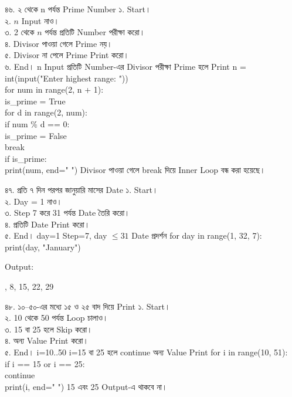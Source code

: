 \exerciseTable
{৪৬. ২ থেকে n পর্যন্ত Prime Number}
{
১. Start।\\
২. \(n\) Input নাও।\\
৩. 2 থেকে \(n\) পর্যন্ত প্রতিটি Number পরীক্ষা করো।\\
৪. Divisor পাওয়া গেলে Prime নয়।\\
৫. Divisor না পেলে Prime Print করো।\\
৬. End।
}
{
\linearflow
{n Input}
{প্রতিটি Number-এর Divisor পরীক্ষা}
{Prime হলে Print}
}
{
n = int(input("Enter highest range: "))\\
for num in range(2, n + 1):\\
\hspace*{4mm}is\_prime = True\\
\hspace*{4mm}for d in range(2, num):\\
\hspace*{8mm}if num \% d == 0:\\
\hspace*{12mm}is\_prime = False\\
\hspace*{12mm}break\\
\hspace*{4mm}if is\_prime:\\
\hspace*{8mm}print(num, end=" ")
}
{
Divisor পাওয়া গেলে
\textenglish{\ttfamily break}
দিয়ে Inner Loop বন্ধ করা হয়েছে।
}


\exerciseTable
{৪৭. প্রতি ৭ দিন পরপর জানুয়ারি মাসের Date}
{
১. Start।\\
২. Day = 1 নাও।\\
৩. Step 7 করে 31 পর্যন্ত Date তৈরি করো।\\
৪. প্রতিটি Date Print করো।\\
৫. End।
}
{
\linearflow
{day=1}
{Step=7,\; day \(\le31\)}
{Date প্রদর্শন}
}
{
for day in range(1, 32, 7):\\
\hspace*{4mm}print(day, "January")
}
{
Output:

\textenglish{, 8, 15, 22, 29}
}


\exerciseTable
{৪৮. ১০–৫০-এর মধ্যে ১৫ ও ২৫ বাদ দিয়ে Print}
{
১. Start।\\
২. 10 থেকে 50 পর্যন্ত Loop চালাও।\\
৩. 15 বা 25 হলে Skip করো।\\
৪. অন্য Value Print করো।\\
৫. End।
}
{
\linearflow
{i=10..50}
{i=15 বা 25 হলে continue}
{অন্য Value Print}
}
{
for i in range(10, 51):\\
\hspace*{4mm}if i == 15 or i == 25:\\
\hspace*{8mm}continue\\
\hspace*{4mm}print(i, end=" ")
}
{
15 এবং 25 Output-এ থাকবে না।
}

